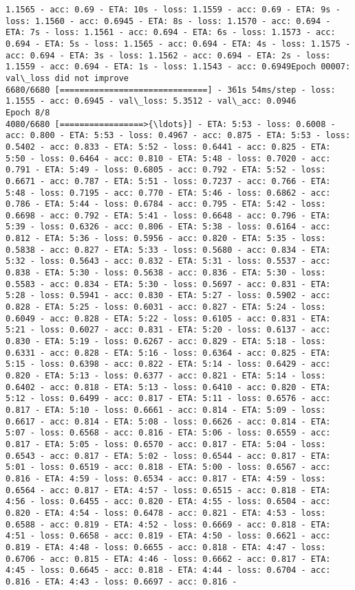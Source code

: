 \documentclass[11pt]{article}
\begin{document}
\begin{Verbatim}[commandchars=\\\{\}]
1.1565 - acc: 0.69 - ETA: 10s - loss: 1.1559 - acc: 0.69 - ETA: 9s - loss: 1.1560 - acc: 0.6945 - ETA: 8s - loss: 1.1570 - acc: 0.694 - ETA: 7s - loss: 1.1561 - acc: 0.694 - ETA: 6s - loss: 1.1573 - acc: 0.694 - ETA: 5s - loss: 1.1565 - acc: 0.694 - ETA: 4s - loss: 1.1575 - acc: 0.694 - ETA: 3s - loss: 1.1562 - acc: 0.694 - ETA: 2s - loss: 1.1559 - acc: 0.694 - ETA: 1s - loss: 1.1543 - acc: 0.6949Epoch 00007: val\_loss did not improve
6680/6680 [==============================] - 361s 54ms/step - loss: 1.1555 - acc: 0.6945 - val\_loss: 5.3512 - val\_acc: 0.0946
Epoch 8/8
4080/6680 [=================>{\ldots}] - ETA: 5:53 - loss: 0.6008 - acc: 0.800 - ETA: 5:53 - loss: 0.4967 - acc: 0.875 - ETA: 5:53 - loss: 0.5402 - acc: 0.833 - ETA: 5:52 - loss: 0.6441 - acc: 0.825 - ETA: 5:50 - loss: 0.6464 - acc: 0.810 - ETA: 5:48 - loss: 0.7020 - acc: 0.791 - ETA: 5:49 - loss: 0.6805 - acc: 0.792 - ETA: 5:52 - loss: 0.6671 - acc: 0.787 - ETA: 5:51 - loss: 0.7237 - acc: 0.766 - ETA: 5:48 - loss: 0.7195 - acc: 0.770 - ETA: 5:46 - loss: 0.6862 - acc: 0.786 - ETA: 5:44 - loss: 0.6784 - acc: 0.795 - ETA: 5:42 - loss: 0.6698 - acc: 0.792 - ETA: 5:41 - loss: 0.6648 - acc: 0.796 - ETA: 5:39 - loss: 0.6326 - acc: 0.806 - ETA: 5:38 - loss: 0.6164 - acc: 0.812 - ETA: 5:36 - loss: 0.5956 - acc: 0.820 - ETA: 5:35 - loss: 0.5838 - acc: 0.827 - ETA: 5:33 - loss: 0.5680 - acc: 0.834 - ETA: 5:32 - loss: 0.5643 - acc: 0.832 - ETA: 5:31 - loss: 0.5537 - acc: 0.838 - ETA: 5:30 - loss: 0.5638 - acc: 0.836 - ETA: 5:30 - loss: 0.5583 - acc: 0.834 - ETA: 5:30 - loss: 0.5697 - acc: 0.831 - ETA: 5:28 - loss: 0.5941 - acc: 0.830 - ETA: 5:27 - loss: 0.5902 - acc: 0.828 - ETA: 5:25 - loss: 0.6031 - acc: 0.827 - ETA: 5:24 - loss: 0.6049 - acc: 0.828 - ETA: 5:22 - loss: 0.6105 - acc: 0.831 - ETA: 5:21 - loss: 0.6027 - acc: 0.831 - ETA: 5:20 - loss: 0.6137 - acc: 0.830 - ETA: 5:19 - loss: 0.6267 - acc: 0.829 - ETA: 5:18 - loss: 0.6331 - acc: 0.828 - ETA: 5:16 - loss: 0.6364 - acc: 0.825 - ETA: 5:15 - loss: 0.6398 - acc: 0.822 - ETA: 5:14 - loss: 0.6429 - acc: 0.820 - ETA: 5:13 - loss: 0.6377 - acc: 0.821 - ETA: 5:14 - loss: 0.6402 - acc: 0.818 - ETA: 5:13 - loss: 0.6410 - acc: 0.820 - ETA: 5:12 - loss: 0.6499 - acc: 0.817 - ETA: 5:11 - loss: 0.6576 - acc: 0.817 - ETA: 5:10 - loss: 0.6661 - acc: 0.814 - ETA: 5:09 - loss: 0.6617 - acc: 0.814 - ETA: 5:08 - loss: 0.6626 - acc: 0.814 - ETA: 5:07 - loss: 0.6568 - acc: 0.816 - ETA: 5:06 - loss: 0.6559 - acc: 0.817 - ETA: 5:05 - loss: 0.6570 - acc: 0.817 - ETA: 5:04 - loss: 0.6543 - acc: 0.817 - ETA: 5:02 - loss: 0.6544 - acc: 0.817 - ETA: 5:01 - loss: 0.6519 - acc: 0.818 - ETA: 5:00 - loss: 0.6567 - acc: 0.816 - ETA: 4:59 - loss: 0.6534 - acc: 0.817 - ETA: 4:59 - loss: 0.6564 - acc: 0.817 - ETA: 4:57 - loss: 0.6515 - acc: 0.818 - ETA: 4:56 - loss: 0.6455 - acc: 0.820 - ETA: 4:55 - loss: 0.6504 - acc: 0.820 - ETA: 4:54 - loss: 0.6478 - acc: 0.821 - ETA: 4:53 - loss: 0.6588 - acc: 0.819 - ETA: 4:52 - loss: 0.6669 - acc: 0.818 - ETA: 4:51 - loss: 0.6658 - acc: 0.819 - ETA: 4:50 - loss: 0.6621 - acc: 0.819 - ETA: 4:48 - loss: 0.6655 - acc: 0.818 - ETA: 4:47 - loss: 0.6706 - acc: 0.815 - ETA: 4:46 - loss: 0.6662 - acc: 0.817 - ETA: 4:45 - loss: 0.6645 - acc: 0.818 - ETA: 4:44 - loss: 0.6704 - acc: 0.816 - ETA: 4:43 - loss: 0.6697 - acc: 0.816 - 
\end{Verbatim}
\end{document}
